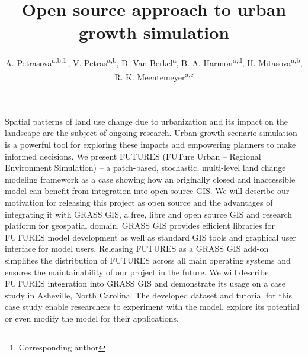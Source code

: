 \documentclass{isprs}
\begin{document}
\title{Open source approach to urban growth simulation}

\author{
A. Petrasova\textsuperscript{a,b,}\thanks{Corresponding author}\,,
V. Petras\textsuperscript{a,b},
D. Van Berkel\textsuperscript{a},
B. A. Harmon\textsuperscript{a,d},
H. Mitasova\textsuperscript{a,b},
R. K. Meentemeyer\textsuperscript{a,c}
}

\address
{
\textsuperscript{a }Center for Geospatial Analytics, North Carolina State University, USA - dbvanber@ncsu.edu\\
\textsuperscript{b }Department of Marine, Earth, and Atmospheric Sciences, North Carolina State University, USA - (vpetras, akratoc, hmitaso)@ncsu.edu\\
\textsuperscript{c }Department of Forestry and Environmental Resources, North Carolina State University, USA - rkmeente@ncsu.edu\\
\textsuperscript{d }Department of Landscape Architecture, North Carolina State University, USA - baharmon@ncsu.edu\\

}


\abstract
{
Spatial patterns of land use change due to urbanization and its impact on the landscape
are the subject of ongoing research. Urban growth scenario simulation is a powerful tool
for exploring these impacts and empowering planners to make informed decisions. 
We present FUTURES (FUTure Urban -- Regional Environment Simulation) -- a patch-based,
stochastic, multi-level land change modeling framework as a case showing how
an originally closed and inaccessible model can benefit from integration into open source GIS.
We will describe our motivation for releasing this project as open source
and the advantages of integrating it with GRASS GIS, a free, libre and open source GIS
and research platform for geospatial domain.  
GRASS GIS provides efficient libraries for FUTURES model development
as well as standard GIS tools and graphical user interface for model users.  
Releasing FUTURES as a GRASS GIS add-on simplifies the distribution of FUTURES
across all main operating systems and ensures the maintainability of our project in the future.
We will describe FUTURES integration into GRASS GIS and demonstrate its usage
on a case study in Asheville, North Carolina.
The developed dataset and tutorial for this case study
enable researchers to experiment with the model, explore its potential or even
modify the model for their applications.




}
\end{document}
